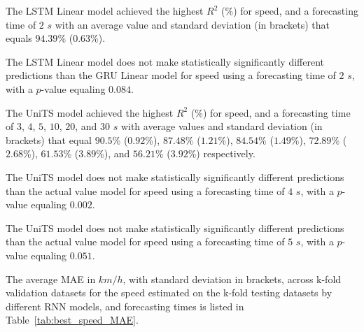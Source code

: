 The LSTM Linear model achieved the highest $R^{2}$ (\%) for speed, and a forecasting time of $2$ $s$ with an average value and standard deviation (in brackets) that equals $94.39$\% ($0.63$\%).

The LSTM Linear model does not make statistically significantly different predictions than the GRU Linear model for speed using a forecasting time of $2$ $s$, with a $p$-value equaling $0.084$.


The UniTS model achieved the highest $R^{2}$ (\%) for speed, and a forecasting time of $3$, $4$, $5$, $10$, $20$, and $30$ $s$ with average values and standard deviation (in brackets) that equal $90.5$\% ($0.92$\%), $87.48$\% ($1.21$\%), $84.54$\% ($1.49$\%), $72.89$\% ($2.68$\%), $61.53$\% ($3.89$\%), and $56.21$\% ($3.92$\%) respectively.

The UniTS model does not make statistically significantly different predictions than the actual value model for speed using a forecasting time of $4$ $s$, with a $p$-value equaling $0.002$.


The UniTS model does not make statistically significantly different predictions than the actual value model for speed using a forecasting time of $5$ $s$, with a $p$-value equaling $0.051$.


The average MAE in $km/h$, with standard deviation in brackets, across k-fold validation datasets for the speed estimated on the k-fold testing datasets by different RNN models, and forecasting times is listed in Table~\ref{tab:best_speed_MAE}.

\begin{table}[!ht]
	\centering
	\caption{The average MAE in $km/h$, with standard deviation in brackets, across k-fold validation datasets for the speed estimated on the k-fold testing datasets by different RNN models, and forecasting times.}
	\label{tab:best_speed_MAE}
\end{table}

